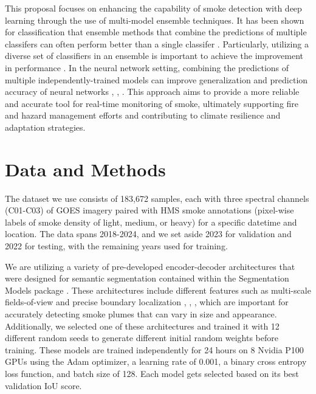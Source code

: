 \documentclass{article}
\begin{document}
This proposal focuses on enhancing the capability of smoke detection with deep learning through the use of multi-model ensemble techniques. It has been shown for classification that ensemble methods that combine the predictions of multiple classifers can often perform better than a single classifer \citep{ensemble-ml}. Particularly, utilizing a diverse set of classifiers in an ensemble is important to achieve the improvement in performance \citep{ensemble-diversity}. In the neural network setting, combining the predictions of multiple independently-trained models can improve generalization and prediction accuracy of neural networks \citep{nn-ensemble}, \citep{nn-ensemble2}, \citep{nn-error-ens}. This approach aims to provide a more reliable and accurate tool for real-time monitoring of smoke, ultimately supporting fire and hazard management efforts and contributing to climate resilience and adaptation strategies.

\section{Data and Methods}
The dataset we use consists of 183,672 samples, each with three spectral channels (C01-C03) of GOES imagery paired with HMS smoke annotations (pixel-wise labels of smoke density of light, medium, or heavy) for a specific datetime and location. The data spans 2018-2024, and we set aside 2023 for validation and 2022 for testing, with the remaining years used for training. 

We are utilizing a variety of pre-developed encoder-decoder architectures that were designed for semantic segmentation contained within the Segmentation Models package \citep{semantic}. These architectures include different features such as multi-scale fields-of-view and precise boundary localization \citep{dlv3p}, \citep{PAN}, \citep{UNetpp}, which are important for accurately detecting smoke plumes that can vary in size and appearance. Additionally, we selected one of these architectures and trained it with 12 different random seeds to generate different initial random weights before training. These models are trained independently for 24 hours on 8 Nvidia P100 GPUs using the Adam optimizer, a learning rate of 0.001, a binary cross entropy loss function, and batch size of 128. Each model gets selected based on its best validation IoU score.
\end{document}
